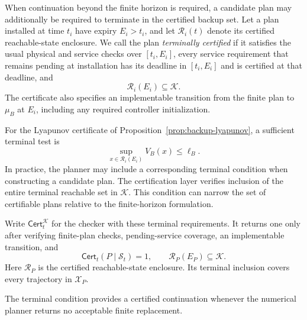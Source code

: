 \documentclass[preprint,12pt]{elsarticle}
\begin{document}
When continuation beyond the finite horizon is required, a candidate plan may
additionally be required to terminate in the certified backup set. Let a plan
installed at time $t_i$ have expiry $E_i>t_i$, and let
$\mathcal R_i(t)$ denote its certified reachable-state enclosure. We call the
plan \emph{terminally certified} if it satisfies the usual physical and
service checks over $[t_i,E_i]$, every service requirement that remains pending at installation has its
deadline in $[t_i,E_i]$ and is certified at that deadline, and
\begin{equation}
\mathcal R_i(E_i)\subseteq\mathcal K.
\label{eq:backup-terminal-landing}
\end{equation}
The certificate also specifies an implementable transition from the finite
plan to $\mu_B$ at $E_i$, including any required controller initialization.

For the Lyapunov certificate of
Proposition~\ref{prop:backup-lyapunov}, a sufficient terminal test is
\begin{equation}
\sup_{x\in\mathcal R_i(E_i)}V_B(x)\le\ell_B.
\label{eq:backup-computable-landing}
\end{equation}
In practice, the planner may include a corresponding terminal condition when
constructing a candidate plan. The certification layer verifies inclusion of
the entire terminal reachable set in $\mathcal K$. This condition can narrow
the set of certifiable plans relative to the finite-horizon formulation.

Write $\mathsf{Cert}^{\mathcal K}_t$ for the checker with these
terminal requirements. It returns one only after verifying finite-plan
checks, pending-service coverage, an implementable transition, and
\begin{equation}
\mathsf{Cert}_t(P\mid\mathcal S_t)=1,\qquad
\mathcal R_P(E_P)\subseteq\mathcal K.
\label{eq:terminal-checker}
\end{equation}
Here $\mathcal R_P$ is the certified reachable-state enclosure. Its
terminal inclusion covers every trajectory in $\mathcal X_P$.

The terminal condition provides a certified continuation whenever the
numerical planner returns no acceptable finite replacement.
\end{document}
